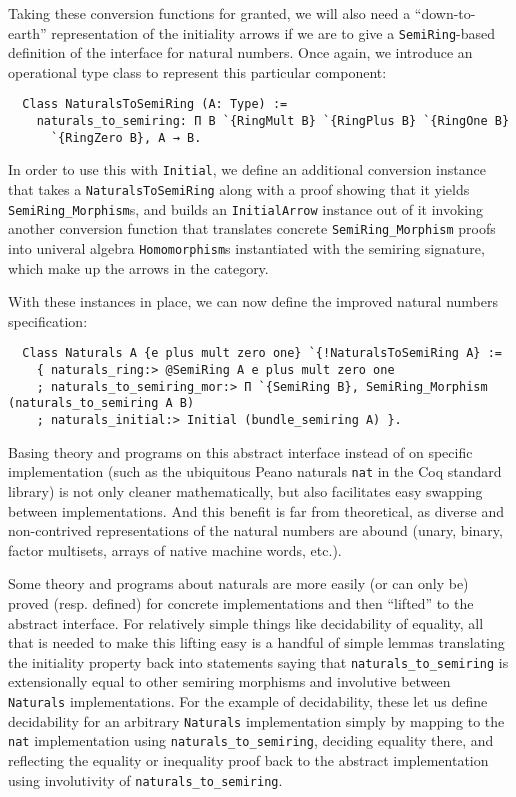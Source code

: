 \documentclass[a4paper,10pt,runningheads]{llncs}
\begin{document}
Taking these conversion functions for granted, we will also need a ``down-to-earth'' representation of the initiality arrows if we are to give a \lstinline|SemiRing|-based definition of the interface for natural numbers. Once again, we introduce an operational type class to represent this particular component:
\begin{lstlisting}
  Class NaturalsToSemiRing (A: Type) :=
    naturals_to_semiring: Π B `{RingMult B} `{RingPlus B} `{RingOne B}
      `{RingZero B}, A → B.
\end{lstlisting}
In order to use this with \lstinline|Initial|, we define an additional conversion instance that takes a \lstinline|NaturalsToSemiRing| along with a proof showing that it yields \lstinline|SemiRing_Morphism|s, and builds an \lstinline|InitialArrow| instance out of it invoking another conversion function that translates concrete \lstinline|SemiRing_Morphism| proofs into univeral algebra \lstinline|Homomorphism|s instantiated with the semiring signature, which make up the arrows in the category.

With these instances in place, we can now define the improved natural numbers specification:
\begin{lstlisting}
  Class Naturals A {e plus mult zero one} `{!NaturalsToSemiRing A} :=
    { naturals_ring:> @SemiRing A e plus mult zero one
    ; naturals_to_semiring_mor:> Π `{SemiRing B}, SemiRing_Morphism (naturals_to_semiring A B)
    ; naturals_initial:> Initial (bundle_semiring A) }.
\end{lstlisting}
Basing theory and programs on this abstract interface instead of on specific implementation (such as the ubiquitous Peano naturals \lstinline|nat| in the Coq standard library) is not only cleaner mathematically, but also facilitates easy swapping between implementations. And this benefit is far from theoretical, as diverse and non-contrived representations of the natural numbers are abound (unary, binary, factor multisets, arrays of native machine words, etc.).

Some theory and programs about naturals are more easily (or can only be) proved (resp. defined) for concrete implementations and then ``lifted'' to the abstract interface. For relatively simple things like decidability of equality, all that is needed to make this lifting easy is a handful of simple lemmas translating the initiality property back into statements saying that \lstinline|naturals_to_semiring| is extensionally equal to other semiring morphisms and involutive between \lstinline|Naturals| implementations. For the example of decidability, these let us define decidability for an arbitrary \lstinline|Naturals| implementation simply by mapping to the \lstinline|nat| implementation using \lstinline|naturals_to_semiring|, deciding equality there, and reflecting the equality or inequality proof back to the abstract implementation using involutivity of \lstinline|naturals_to_semiring|.
\end{document}
